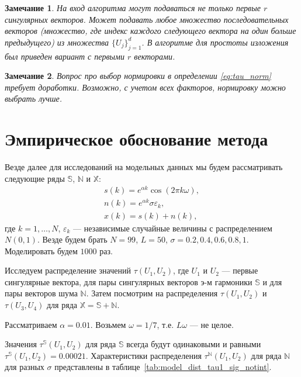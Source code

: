 \documentclass[specialist,
               substylefile = spbu.rtx,
               subf,href,colorlinks=true, 12pt]{disser}
\newtheorem{remark}{Замечание}
\begin{document}
\begin{remark}
На вход алгоритма могут подаваться не только первые $r$ сингулярных векторов. Может подавать любое множество последовательных векторов (множество, где индекс каждого следующего вектора на один больше предыдущего) из множества $\{U_j\}_{j=1}^{d}$. В алгоритме для простоты изложения был приведен вариант с первыми $r$ векторами.
\end{remark}

\begin{remark}
Вопрос про выбор нормировки в определении \eqref{eq:tau_norm} требует доработки. Возможно, с учетом всех факторов, нормировку можно выбрать лучше.
\end{remark}

\section{Эмпирическое обоснование метода}
\label{sec:tau_study}
Везде далее для исследований на модельных данных мы будем рассматривать следующие ряды $\mathbb{S}$, $\mathbb{N}$ и $\mathbb{X}$:
\begin{gather} \label{eq:series_S_N}
s(k) =  e^{\alpha k} \cos(2\pi k \omega), \\  \label{eq:series_N_N}
n(k) =  e^{\alpha k} \sigma \varepsilon_k, \\ \label{eq:series_X_N}
x(k) = s(k) + n(k),
\end{gather}
где $k=1,\ldots,N$, $\varepsilon_k$ --- независимые случайные величины с распределением $N(0,1)$. Везде будем брать $N = 99$, $L = 50$, $\sigma = 0.2, 0.4, 0.6, 0.8, 1$. Моделировать будем $1000$ раз.

Исследуем распределение
 значений $\tau(U_1, U_2)$, где $U_1$ и $U_2$ --- первые сингулярные вектора, для пары сингулярных векторов э-м гармоники $\mathbb{S}$ и для пары векторов шума $\mathbb{N}$. Затем посмотрим на распределения  $\tau(U_1, U_2)$ и  $\tau(U_3, U_4)$ для ряда $\mathbb{X} = \mathbb{S} + \mathbb{N}$.

Рассматриваем $\alpha = 0.01$. Возьмем $\omega = 1/7$, т.е. $L\omega$ --- не целое.

Значения $\tau^{\mathbb{S}}(U_1, U_2)$  для ряда $\mathbb{S}$ всегда будут одинаковыми и равными  $\tau^{\mathbb{S}}(U_1, U_2) = 0.00021$. Характеристики распределения $\tau^{\mathbb{N}}(U_1, U_2)$ для ряда $\mathbb{N}$ для разных $\sigma$ представлены в таблице~\ref{tab:model_dist_tau1_sig_notint}.
\end{document}
